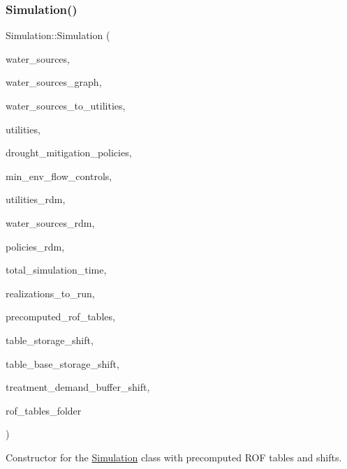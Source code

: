 \subsubsection{\texorpdfstring{Simulation()}{Simulation()}\hspace{0.1cm}{\footnotesize\ttfamily [2/3]}}
{\footnotesize\ttfamily Simulation\+::\+Simulation (\begin{DoxyParamCaption}\item[{vector$<$ \mbox{\hyperlink{classWaterSource}{Water\+Source}} $\ast$$>$ \&}]{water\+\_\+sources,  }\item[{Graph \&}]{water\+\_\+sources\+\_\+graph,  }\item[{const vector$<$ vector$<$ int $>$$>$ \&}]{water\+\_\+sources\+\_\+to\+\_\+utilities,  }\item[{vector$<$ \mbox{\hyperlink{classUtility}{Utility}} $\ast$$>$ \&}]{utilities,  }\item[{const vector$<$ Drought\+Mitigation\+Policy $\ast$$>$ \&}]{drought\+\_\+mitigation\+\_\+policies,  }\item[{vector$<$ Min\+Env\+Flow\+Control $\ast$$>$ \&}]{min\+\_\+env\+\_\+flow\+\_\+controls,  }\item[{vector$<$ vector$<$ double $>$$>$ \&}]{utilities\+\_\+rdm,  }\item[{vector$<$ vector$<$ double $>$$>$ \&}]{water\+\_\+sources\+\_\+rdm,  }\item[{vector$<$ vector$<$ double $>$$>$ \&}]{policies\+\_\+rdm,  }\item[{const unsigned long}]{total\+\_\+simulation\+\_\+time,  }\item[{vector$<$ unsigned long $>$ \&}]{realizations\+\_\+to\+\_\+run,  }\item[{vector$<$ vector$<$ Matrix2D$<$ double $>$$>$$>$ \&}]{precomputed\+\_\+rof\+\_\+tables,  }\item[{vector$<$ vector$<$ double $>$$>$ \&}]{table\+\_\+storage\+\_\+shift,  }\item[{vector$<$ vector$<$ double $>$$>$ \&}]{table\+\_\+base\+\_\+storage\+\_\+shift,  }\item[{vector$<$ vector$<$ double $>$$>$ \&}]{treatment\+\_\+demand\+\_\+buffer\+\_\+shift,  }\item[{string \&}]{rof\+\_\+tables\+\_\+folder }\end{DoxyParamCaption})}



Constructor for the \mbox{\hyperlink{classSimulation}{Simulation}} class with precomputed R\+OF tables and shifts. 

